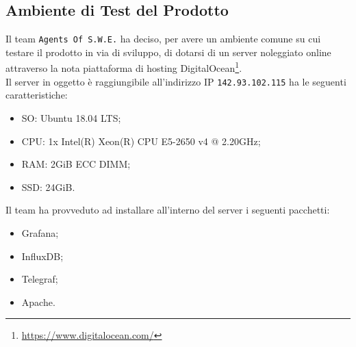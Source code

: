 \subsection{Ambiente di Test del Prodotto}\label{Server}
Il team \texttt{Agents Of S.W.E.} ha deciso, per avere un ambiente comune su cui testare il prodotto in via di sviluppo, di dotarsi di un server noleggiato online attraverso la nota piattaforma di hosting DigitalOcean\footnote{\url{https://www.digitalocean.com/}}.\\
Il server in oggetto è raggiungibile all'indirizzo IP \texttt{142.93.102.115} ha le seguenti caratteristiche:
\begin{itemize}
	\item SO: Ubuntu 18.04 LTS;
	\item CPU: 1x Intel(R) Xeon(R) CPU E5-2650 v4 @ 2.20GHz;
	\item RAM: 2GiB ECC DIMM;
	\item SSD: 24GiB.
\end{itemize}
Il team ha provveduto ad installare all'interno del server i seguenti pacchetti:
\begin{itemize}
	\item Grafana;
	\item InfluxDB;
	\item Telegraf;
	\item Apache\glossario.
\end{itemize}
